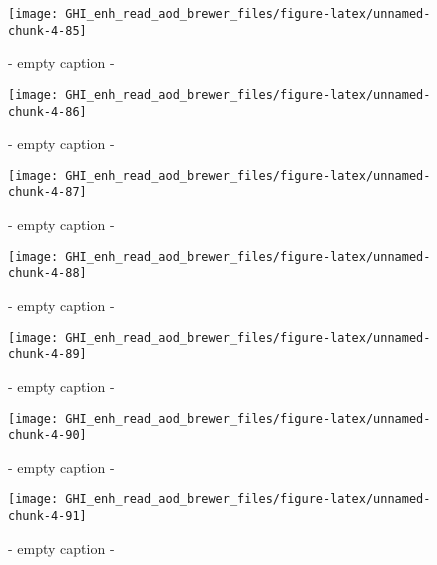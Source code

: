 \documentclass[
  10pt,
  a4paper,oneside]{article}
\begin{document}
\begin{figure}[H]

{\centering \texttt{[image: GHI\_enh\_read\_aod\_brewer\_files/figure-latex/unnamed-chunk-4-85]} 

}

\caption{ - empty caption - }\label{fig:unnamed-chunk-4-85}
\end{figure}
\begin{figure}[H]

{\centering \texttt{[image: GHI\_enh\_read\_aod\_brewer\_files/figure-latex/unnamed-chunk-4-86]} 

}

\caption{ - empty caption - }\label{fig:unnamed-chunk-4-86}
\end{figure}
\begin{figure}[H]

{\centering \texttt{[image: GHI\_enh\_read\_aod\_brewer\_files/figure-latex/unnamed-chunk-4-87]} 

}

\caption{ - empty caption - }\label{fig:unnamed-chunk-4-87}
\end{figure}
\begin{figure}[H]

{\centering \texttt{[image: GHI\_enh\_read\_aod\_brewer\_files/figure-latex/unnamed-chunk-4-88]} 

}

\caption{ - empty caption - }\label{fig:unnamed-chunk-4-88}
\end{figure}
\begin{figure}[H]

{\centering \texttt{[image: GHI\_enh\_read\_aod\_brewer\_files/figure-latex/unnamed-chunk-4-89]} 

}

\caption{ - empty caption - }\label{fig:unnamed-chunk-4-89}
\end{figure}
\begin{figure}[H]

{\centering \texttt{[image: GHI\_enh\_read\_aod\_brewer\_files/figure-latex/unnamed-chunk-4-90]} 

}

\caption{ - empty caption - }\label{fig:unnamed-chunk-4-90}
\end{figure}
\begin{figure}[H]

{\centering \texttt{[image: GHI\_enh\_read\_aod\_brewer\_files/figure-latex/unnamed-chunk-4-91]} 

}

\caption{ - empty caption - }\label{fig:unnamed-chunk-4-91}
\end{figure}
\end{document}
